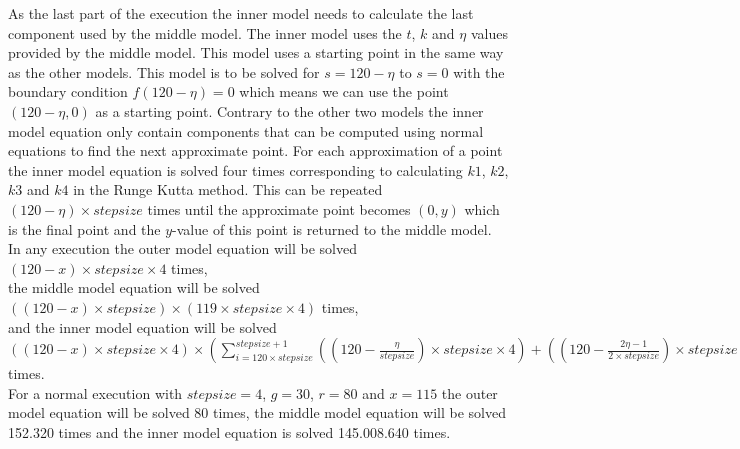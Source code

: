	As the last part of the execution the inner model needs to calculate the last component used by the middle model. The inner model uses the $t$, $k$ and $\eta$ values provided by the middle model. This model uses a starting point in the same way as the other models. This model is to be solved for $s = 120 - \eta$ to $s=0$ with the boundary condition $f(120 - \eta) = 0$ which means we can use the point $(120-\eta,0)$ as a starting point. Contrary to the other two models the inner model equation only contain components that can be computed using normal equations to find the next approximate point. For each approximation of a point the inner model equation is solved four times corresponding to calculating $k1$, $k2$, $k3$ and $k4$ in the Runge Kutta method. This can be repeated $(120 - \eta) \times stepsize$ times until the approximate point becomes $(0,y)$ which is the final point and the $y$-value of this point is returned to the middle model. \\ 
	
	In any execution the outer model equation will be solved \\
	$(120-x) \times stepsize \times 4$ times,\\
	the middle model equation will be solved \\
	$((120-x) \times stepsize) \times (119 \times stepsize \times 4)$ times, \\
	and the inner model equation will be solved \\
	 $((120-x) \times stepsize \times 4) \times 
	(\sum\limits_{i=120 \times stepsize}^{stepsize+1} 
	(
	(120 - \frac{\eta}{stepsize}) \times stepsize \times 4) + 
	((120 - \frac{2\eta - 1}{2 \times stepsize})\times stepsize \times 4) +
	((120 - \frac{2\eta - 1}{2 \times stepsize})\times stepsize \times 4) +
	(120 - \frac{\eta-1}{stepsize}) \times stepsize \times 4)
	)$ times.\\
	
	For a normal execution with $stepsize=4$, $g=30$, $r=80$ and $x=115$ the outer model equation will be solved 80 times, the middle model equation will be solved 152.320 times and the inner model equation is solved 145.008.640 times.
